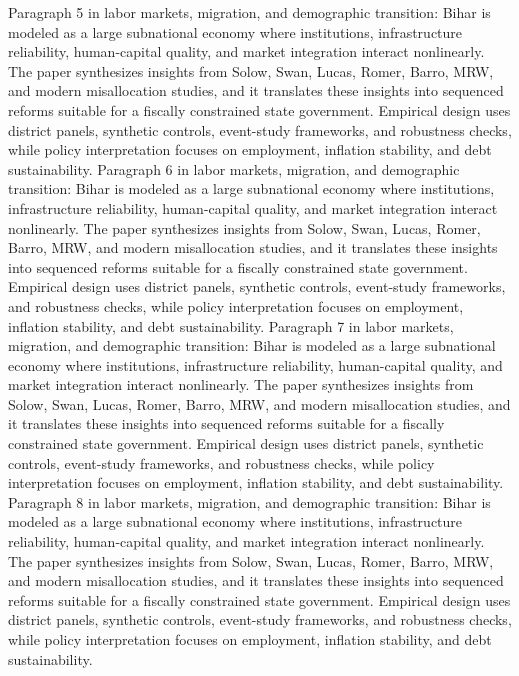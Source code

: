 \documentclass[preprint,12pt]{elsarticle}
\begin{document}
Paragraph 5 in labor markets, migration, and demographic transition: Bihar is modeled as a large subnational economy where institutions, infrastructure reliability, human-capital quality, and market integration interact nonlinearly. The paper synthesizes insights from Solow, Swan, Lucas, Romer, Barro, MRW, and modern misallocation studies, and it translates these insights into sequenced reforms suitable for a fiscally constrained state government. Empirical design uses district panels, synthetic controls, event-study frameworks, and robustness checks, while policy interpretation focuses on employment, inflation stability, and debt sustainability.
Paragraph 6 in labor markets, migration, and demographic transition: Bihar is modeled as a large subnational economy where institutions, infrastructure reliability, human-capital quality, and market integration interact nonlinearly. The paper synthesizes insights from Solow, Swan, Lucas, Romer, Barro, MRW, and modern misallocation studies, and it translates these insights into sequenced reforms suitable for a fiscally constrained state government. Empirical design uses district panels, synthetic controls, event-study frameworks, and robustness checks, while policy interpretation focuses on employment, inflation stability, and debt sustainability.
Paragraph 7 in labor markets, migration, and demographic transition: Bihar is modeled as a large subnational economy where institutions, infrastructure reliability, human-capital quality, and market integration interact nonlinearly. The paper synthesizes insights from Solow, Swan, Lucas, Romer, Barro, MRW, and modern misallocation studies, and it translates these insights into sequenced reforms suitable for a fiscally constrained state government. Empirical design uses district panels, synthetic controls, event-study frameworks, and robustness checks, while policy interpretation focuses on employment, inflation stability, and debt sustainability.
Paragraph 8 in labor markets, migration, and demographic transition: Bihar is modeled as a large subnational economy where institutions, infrastructure reliability, human-capital quality, and market integration interact nonlinearly. The paper synthesizes insights from Solow, Swan, Lucas, Romer, Barro, MRW, and modern misallocation studies, and it translates these insights into sequenced reforms suitable for a fiscally constrained state government. Empirical design uses district panels, synthetic controls, event-study frameworks, and robustness checks, while policy interpretation focuses on employment, inflation stability, and debt sustainability.
\end{document}
